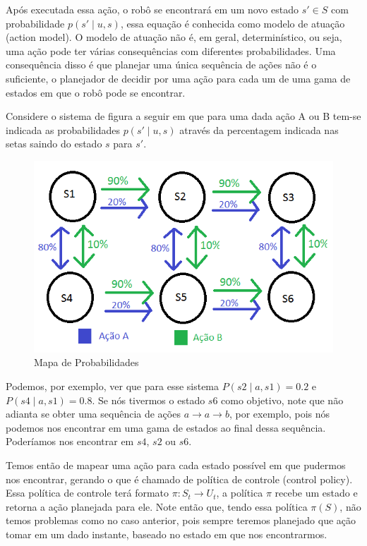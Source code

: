 Após executada essa ação, o robô se encontrará em um novo estado $ s' \in S $ com probabilidade $ p \left( s' \mid u, s \right) $, essa equação é conhecida como modelo de atuação (action model). O modelo de atuação não é, em geral, determinístico, ou seja, uma ação pode ter várias consequências com diferentes probabilidades. Uma consequência disso é que planejar uma única sequência de ações não é o suficiente, o planejador de decidir por uma ação para cada um de uma gama de estados em que o robô pode se encontrar.

Considere o sistema de figura a seguir em que para uma dada ação A ou B tem-se indicada as probabilidades $ p \left( s' \mid u, s \right) $ através da percentagem indicada nas setas saindo do estado $ s $ para $ s' $.


\begin{figure}[h]
    \centering
    \includegraphics[width=120mm]{images/probabilidade-markov}
    \caption{\label{img:MapaDeProbabilidadesMarkov}Mapa de Probabilidades}
\end{figure}

Podemos, por exemplo, ver que para esse sistema $ P \left( s2 \mid a, s1 \right) = 0.2 $ e $ P \left( s4 \mid a, s1 \right) = 0.8 $. Se nós tivermos o estado $ s6 $ como objetivo, note que não adianta se obter uma sequência de ações $ a \rightarrow a \rightarrow b$, por exemplo, pois nós podemos nos encontrar em uma gama de estados ao final dessa sequência. Poderíamos nos encontrar em $ s4 $, $ s2 $ ou $ s6 $.

Temos então de mapear uma ação para cada estado possível em que pudermos nos encontrar, gerando o que é chamado de política de controle (control policy). Essa política de controle terá formato $ \pi: S_t \rightarrow U_t $, a política $ \pi $ recebe um estado e retorna a ação planejada para ele. Note então que, tendo essa política $ \pi \left( S \right) $, não temos problemas como no caso anterior, pois sempre teremos planejado que ação tomar em um dado instante, baseado no estado em que nos encontrarmos.

